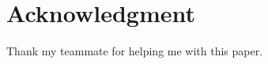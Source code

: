 \documentclass[10pt,journal,compsoc]{IEEEtran}
\begin{document}
  \section*{Acknowledgment}
\fi

Thank my teammate for helping me with this paper.

\ifCLASSOPTIONcaptionsoff
  \newpage
\fi





%
%
%
%
%



%
\end{document}
